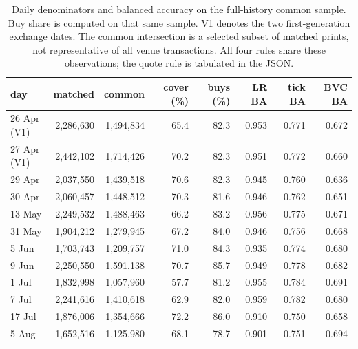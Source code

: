 \begin{table}[htbp]
\centering\scriptsize\setlength{\tabcolsep}{3.5pt}
\begin{tabular}{lrrrrrrr}
\toprule
day & matched & common & cover (\%) & buys (\%) & LR BA & tick BA & BVC BA \\
\midrule
26 Apr (V1) & 2{,}286{,}630 & 1{,}494{,}834 & 65.4 & 82.3 & 0.953 & 0.771 & 0.672 \\
27 Apr (V1) & 2{,}442{,}102 & 1{,}714{,}426 & 70.2 & 82.3 & 0.951 & 0.772 & 0.660 \\
29 Apr & 2{,}037{,}550 & 1{,}439{,}518 & 70.6 & 82.3 & 0.945 & 0.760 & 0.636 \\
30 Apr & 2{,}060{,}457 & 1{,}448{,}512 & 70.3 & 81.6 & 0.946 & 0.762 & 0.651 \\
13 May & 2{,}249{,}532 & 1{,}488{,}463 & 66.2 & 83.2 & 0.956 & 0.775 & 0.671 \\
31 May & 1{,}904{,}212 & 1{,}279{,}945 & 67.2 & 84.0 & 0.946 & 0.756 & 0.668 \\
5 Jun & 1{,}703{,}743 & 1{,}209{,}757 & 71.0 & 84.3 & 0.935 & 0.774 & 0.680 \\
9 Jun & 2{,}250{,}550 & 1{,}591{,}138 & 70.7 & 85.7 & 0.949 & 0.778 & 0.682 \\
1 Jul & 1{,}832{,}998 & 1{,}057{,}960 & 57.7 & 81.2 & 0.955 & 0.784 & 0.691 \\
7 Jul & 2{,}241{,}616 & 1{,}410{,}618 & 62.9 & 82.0 & 0.959 & 0.782 & 0.680 \\
17 Jul & 1{,}876{,}006 & 1{,}354{,}666 & 72.2 & 86.0 & 0.910 & 0.750 & 0.658 \\
5 Aug & 1{,}652{,}516 & 1{,}125{,}980 & 68.1 & 78.7 & 0.901 & 0.751 & 0.694 \\
\bottomrule
\end{tabular}
\caption{Daily denominators and balanced accuracy on the full-history common sample. Buy share is computed on that same sample. V1 denotes the two first-generation exchange dates. The common intersection is a selected subset of matched prints, not representative of all venue transactions. All four rules share these observations; the quote rule is tabulated in the JSON.}
\label{tab:cached-days}
\end{table}
